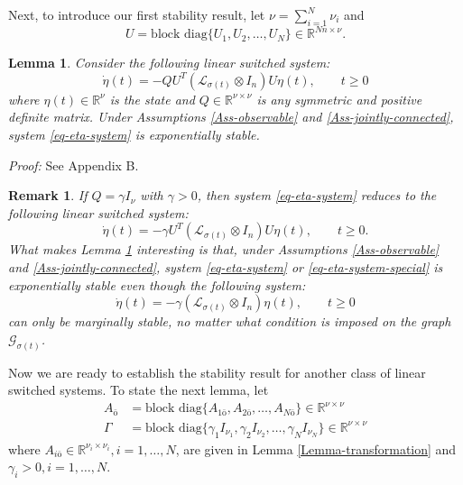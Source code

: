 \documentclass[twocolumn]{autart}
\newcommand{\RR}{\mathbb{R}}
\newtheorem{Remark}{Remark}
\newtheorem{Lemma}{Lemma}
\begin{document}
Next, to introduce our first stability result,
let $\nu=\sum_{i=1}^{N}\nu_{i}$ and
\begin{equation}\label{eq-U-block-def}
     U=\text{block diag}\{U_{1},U_{2},\ldots, U_{N}\} \in \RR^{Nn \times \nu}.
\end{equation}



\begin{Lemma}\label{Lemma-eta-stable}
  Consider the following linear switched system:
  \begin{equation}\label{eq-eta-system}
    \dot{\eta}(t)=- Q U^{T}\left(\mathcal{L}_{\sigma(t)} \otimes I_{n}\right)U\eta(t), \qquad t\ge 0
  \end{equation}
  where $\eta(t) \in \RR^{\nu}$ is the state
  and $Q \in \RR^{\nu\times \nu}$ is any symmetric and positive definite matrix.
  Under Assumptions \ref{Ass-observable} and \ref{Ass-jointly-connected},
  system \eqref{eq-eta-system} is exponentially stable.
\end{Lemma}
\emph{Proof:} See Appendix B.




\begin{Remark}
If $Q=\gamma I_{\nu}$ with $\gamma>0$,
then system \eqref{eq-eta-system} reduces to the following linear switched system:
 \begin{equation}\label{eq-eta-system-special}
    \dot{\eta}(t)=- \gamma U^{T}\left(\mathcal{L}_{\sigma(t)} \otimes I_{n}\right)U\eta(t), \qquad t\ge 0.
 \end{equation}
What makes Lemma \ref{Lemma-eta-stable} interesting is that,
under Assumptions \ref{Ass-observable} and \ref{Ass-jointly-connected},
system \eqref{eq-eta-system} or \eqref{eq-eta-system-special} is exponentially stable even though the following system:
 \begin{equation*}
    \dot{\eta}(t)=-\gamma \left(\mathcal{L}_{\sigma(t)} \otimes I_{n}\right) \eta(t), \qquad t\ge 0
  \end{equation*}
can only be marginally stable, no matter what condition is imposed on the graph $\mathcal{G}_{\sigma(t)}$.
\end{Remark}


Now we are ready to establish the stability result for another class of linear switched systems.
To state the next lemma, let
\begin{align}
    A_{\bar{\text{o}}}&=\text{block diag}\{A_{1\bar{\text{o}}}, A_{2\bar{\text{o}}},\ldots, A_{N\bar{\text{o}}}\} \in \RR^{\nu \times \nu} \label{eq-A-o-block-def}\\
\Gamma &= \text{block diag}\{\gamma_{1}I_{\nu_{1}},\gamma_{2}I_{\nu_{2}},\ldots, \gamma_{N}I_{\nu_{N}}\} \in \RR^{\nu \times \nu} \label{eq-Gamma-block-def}
\end{align}
where $A_{i\bar{\text{o}}} \in \RR^{\nu_{i} \times \nu_{i}}, i=1,\ldots,N$, are given in Lemma \ref{Lemma-transformation}
 and $\gamma_{i}>0, i=1,\ldots,N$.
\end{document}
